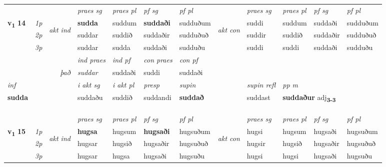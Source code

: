 \begin{longtable}[l]{X>{\footnotesize\itshape}llXXXXlXXXX}
 & &   & \textit{praes sg}  & \textit{praes pl}    & \textit{ pf sg} & \textit{pf pl} & & \textit{praes sg}  & \textit{praes pl}    & \textit{pf sg} & \textit{pf pl }  \\ \cmidrule{4-7} \cmidrule{9-12}
 \multirow{2}{*}{{{\textbf{v{\textsubscript{1}}} \Large{\textbf{14}}}}}  & 1p & \multirow{3}{*}{\begin{turn}{90}\textit{akt ind}\end{turn}} & \textbf{sudda} & suddum & \textbf{suddaði} & sudduðum & \multirow{3}{*}{\begin{turn}{90}\textit{akt con}\end{turn}} &suddi & suddum & suddaði & sudduðum\\*
 & 2p &  &  suddar  & suddið & suddaðir & sudduðuð & & suddir & suddið & suddaðir & sudduðuð \\*
 & 3p &  & suddar & sudda & suddaði & sudduðu & & suddi & suddi& suddaði & sudduðu \\*
\cmidrule{4-7} \cmidrule{9-12}

   && &  \textit{ind praes} & \textit{ind pf} & \textit{con praes} & \textit{con pf} \\*
\multicolumn{3}{r}{\textit{það}} & suddar & suddaði & suddi & suddaði \\*

\cmidrule{4-7}
   {\textit{inf}} & &  & \textit{i akt sg} & \textit{i akt pl}   & \textit{presp} & \textit{supin} && \textit{supin refl} & \textit{pp m} \\*
  {\textbf{sudda}} & && suddaðu  & suddið   & suddandi &  \textbf{suddað} && suddast & \multicolumn{2}{l}{\textbf{suddaður} adj\textbf{\textsubscript{3-3}}} \\*

\midrule


  & \\*
   & \\*
  & \\
   \midrule
 & &   & \textit{praes sg}  & \textit{praes pl}    & \textit{ pf sg} & \textit{pf pl} & & \textit{praes sg}  & \textit{praes pl}    & \textit{pf sg} & \textit{pf pl }  \\ \cmidrule{4-7} \cmidrule{9-12}
 \multirow{2}{*}{{{\textbf{v{\textsubscript{1}}} \Large{\textbf{15}}}}}  & 1p & \multirow{3}{*}{\begin{turn}{90}\textit{akt ind}\end{turn}} & \textbf{hugsa} & hugsum & \textbf{hugsaði} & hugsuðum & \multirow{3}{*}{\begin{turn}{90}\textit{akt con}\end{turn}} &hugsi & hugsum & hugsaði & hugsuðum\\*
 & 2p &  &  hugsar  & hugsið & hugsaðir & hugsuðuð & & hugsir & hugsið & hugsaðir & hugsuðuð \\*
 & 3p &  & hugsar & hugsa & hugsaði & hugsuðu & & hugsi & hugsi& hugsaði & hugsuðu \\*
\cmidrule{4-7} \cmidrule{9-12}


\end{longtable}

